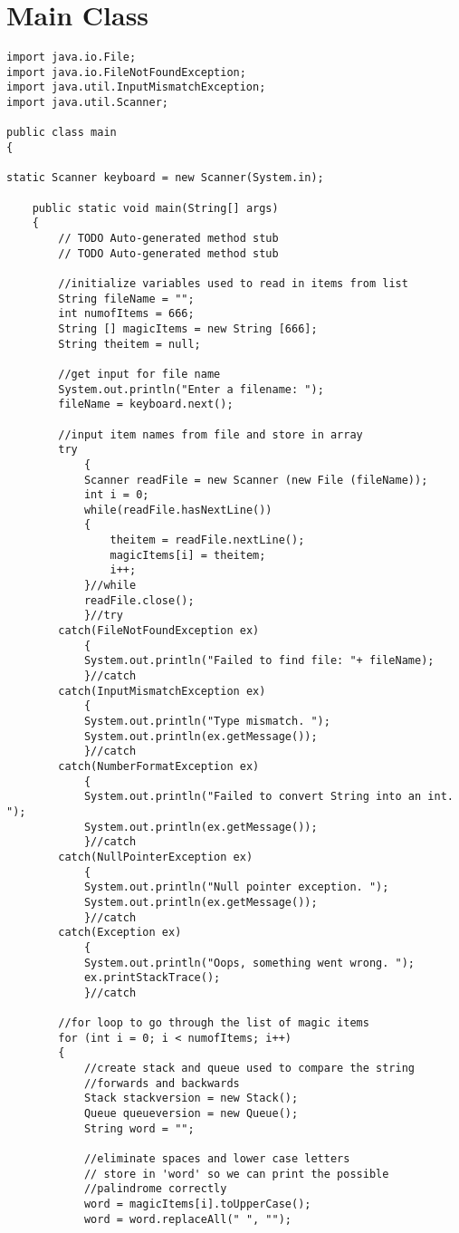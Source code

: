 \documentclass{article}
\begin{document}
\section{Main Class}
\begin{lstlisting}[frame = single,
backgroundcolor = \color{grey!12}]
import java.io.File;
import java.io.FileNotFoundException;
import java.util.InputMismatchException;
import java.util.Scanner;

public class main 
{

static Scanner keyboard = new Scanner(System.in);

	public static void main(String[] args) 
	{
		// TODO Auto-generated method stub
		// TODO Auto-generated method stub

		//initialize variables used to read in items from list
		String fileName = ""; 
		int numofItems = 666;
		String [] magicItems = new String [666];
		String theitem = null;
		
		//get input for file name
		System.out.println("Enter a filename: ");
		fileName = keyboard.next();
		
		//input item names from file and store in array
		try
			{
			Scanner readFile = new Scanner (new File (fileName));
			int i = 0; 
			while(readFile.hasNextLine())
			{
				theitem = readFile.nextLine();
				magicItems[i] = theitem;
				i++;
			}//while
			readFile.close();
			}//try
		catch(FileNotFoundException ex)
			{
			System.out.println("Failed to find file: "+ fileName);
			}//catch
		catch(InputMismatchException ex)
			{
			System.out.println("Type mismatch. ");
			System.out.println(ex.getMessage());
			}//catch
		catch(NumberFormatException ex)
			{
			System.out.println("Failed to convert String into an int. ");
			System.out.println(ex.getMessage());
			}//catch
		catch(NullPointerException ex)
			{
			System.out.println("Null pointer exception. ");
			System.out.println(ex.getMessage());
			}//catch
		catch(Exception ex)
			{
			System.out.println("Oops, something went wrong. ");
			ex.printStackTrace();
			}//catch
		
		//for loop to go through the list of magic items
		for (int i = 0; i < numofItems; i++)
		{
			//create stack and queue used to compare the string
			//forwards and backwards
			Stack stackversion = new Stack();
			Queue queueversion = new Queue();
			String word = "";
			
			//eliminate spaces and lower case letters
			// store in 'word' so we can print the possible 
			//palindrome correctly
			word = magicItems[i].toUpperCase();
			word = word.replaceAll(" ", "");
			

\end{lstlisting}
\end{document}
